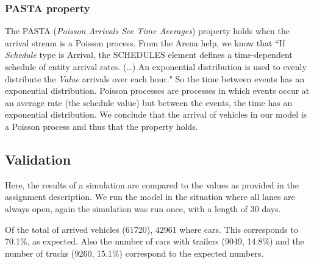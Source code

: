 \subsubsection{PASTA property}
The PASTA (\textit{Poisson Arrivals See Time Averages}) property holds when the arrival stream is a Poisson process.
From the Arena help, we know that ``If \textit{Schedule} type is Arrival, the SCHEDULES element defines a time-dependent schedule of entity arrival rates. (\ldots)
An exponential distribution is used to evenly distribute the \textit{Value} arrivals over each hour."
So the time between events has an exponential distribution.
Poisson processes are processes in which events occur at an average rate (the schedule value) but between the events, the time has an exponential distribution.
We conclude that the arrival of vehicles in our model is a Poisson process and thus that the property holds.

\subsection{Validation}
Here, the results of a simulation are compared to the values as provided in the assignment description.
We run the model in the situation where all lanes are always open, again the simulation was run once, with a length of 30 days.

Of the total of arrived vehicles (61720), 42961 where cars. 
This corresponds to 70.1\%, as expected.
Also the number of cars with trailers (9049, 14.8\%) and the number of trucks (9260, 15.1\%) correspond to the expected numbers.
